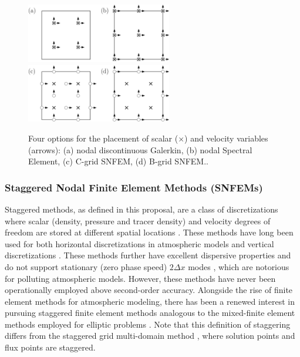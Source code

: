 \documentclass[11pt]{article}
\begin{document}
\begin{figure}[p]
\begin{center}
\includegraphics[width=2.5in]{NodalArrangement-Left.png}
\includegraphics[width=2.5in]{NodalArrangement-Right.png}
\end{center}
\caption{Four options for the placement of scalar ($\times$) and velocity variables (arrows): (a) nodal discontinuous Galerkin, (b) nodal Spectral Element, (c) C-grid SNFEM, (d) B-grid SNFEM..} \label{fig:NodalArrangement}
\end{figure}

\subsubsection{Staggered Nodal Finite Element Methods (SNFEMs)} \label{sec:SNFEM}

Staggered methods, as defined in this proposal, are a class of discretizations where scalar (density, pressure and tracer density) and velocity degrees of freedom are stored at different spatial locations \cite{AAVRL1977GCM}.  These methods have long been used for both horizontal discretizations in atmospheric models \cite{lin2004vertically, putman2009finite, skamarock2005wrf, skamarock2012mpas, thuburn2009numerical} and vertical discretizations \cite{arakawa1988baroclinic, charney1953numerical}.  These methods further have excellent dispersive properties and do not support stationary (zero phase speed) $2 \Delta x$ modes \cite{randall1994geostrophic, thuburn2005vertical, ullrich2014understanding}, which are notorious for polluting atmospheric models.  However, these methods have never been operationally employed above second-order accuracy.  Alongside the rise of finite element methods for atmospheric modeling, there has been a renewed interest in pursuing staggered finite element methods \cite{boffi2009some, cotter2009mixed, cotter2011numerical, cotter2012mixed, staniforth2013analysis} analogous to the mixed-finite element methods employed for elliptic problems \cite{PRJT1977MAFEM}.  Note that this definition of staggering differs from the staggered grid multi-domain method \cite{kopriva1996conservative}, where solution points and flux points are staggered.
\end{document}
